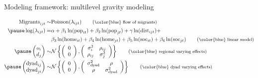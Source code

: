 \documentclass{beamer}
\begin{document}
\begin{frame}[fragile]{Modeling framework: multilevel gravity modeling}
\begin{small}
  \begin{align}
  	\text{Migrants}_{ijt} \sim & \text{Poisson}(\lambda_{ijt})\tag{\footnotesize \color{blue} flow of migrants}\\ \pause
  	\log(\lambda_{ijt}) = & \alpha + \beta_1 \ln(\text{pop}_{it}) + \beta_2
  	\ln(\text{pop}_{jt}) +
  	\gamma \ln(\text{dist}_{ijt}) + \notag \\
  	& \beta_3 \ln(\text{home}_{it}) +
  	\beta_4 \ln(\text{home}_{jt}) +
  	\beta_5 \ln(\text{soc}_{it}) + \beta_6
  	\ln(\text{soc}_{jt})  \tag{\footnotesize \color{blue} linear model} \\ \pause
	\begin{pmatrix}o_i\\
	d_j
\end{pmatrix} \sim &\mathcal{N} \left\{\left(\begin{array}{c}
	0\\
	0
\end{array}\right),
\left(                                        
\begin{array}{cc}
	\sigma^2_i & \rho_{ij} \\
	\rho_{ij} & \sigma^2_{j} 
\end{array}
\right)
\right\} \tag{\footnotesize \color{blue} regional varying effects} \\ \pause
	\begin{pmatrix}\text{dyad}_{ij}\\
	\text{dyad}_{ji}
\end{pmatrix} \sim & \mathcal{N} \left\{\left(\begin{array}{c}
	0\\
	0
\end{array}\right),
\left(                                        
\begin{array}{cc}
	\sigma^2_{\text{dyad}} & \rho \\
	\rho & \sigma^2_{\text{dyad}} 
\end{array}
\right)
\right\} \tag{\footnotesize \color{blue} dyad varying effects} 
\end{align}
\end{small}
\end{frame}
\end{document}
